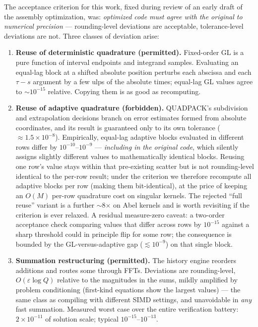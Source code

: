 \documentclass[11pt]{article}
\begin{document}
The acceptance criterion for this work, fixed during review of an
early draft of the assembly optimization, was: \emph{optimized code
must agree with the original to numerical precision} --- rounding-level
deviations are acceptable, tolerance-level deviations are not. Three
classes of deviation arise:

\begin{enumerate}
\item \textbf{Reuse of deterministic quadrature (permitted).}
  Fixed-order GL is a pure function of interval endpoints and integrand
  samples. Evaluating an equal-lag block at a shifted absolute position
  perturbs each abscissa and each $\tau-s$ argument by a few ulps of
  the absolute times; equal-lag GL values agree to $\sim10^{-15}$
  relative. Copying them is as good as recomputing.
\item \textbf{Reuse of adaptive quadrature (forbidden).} QUADPACK's
  subdivision and extrapolation decisions branch on error estimates
  formed from absolute coordinates, and its result is guaranteed only
  to its own tolerance ($\approx1.5\times10^{-8}$). Empirically,
  equal-lag adaptive blocks evaluated in different rows differ by
  $10^{-10}$--$10^{-9}$ --- \emph{including in the original code},
  which silently assigns slightly different values to mathematically
  identical blocks. Reusing one row's value stays within that
  pre-existing scatter but is not rounding-level identical to the
  per-row result; under the criterion we therefore recompute all
  adaptive blocks per row (making them bit-identical), at the price of
  keeping an $O(M)$ per-row quadrature cost on singular kernels. The
  rejected ``full reuse'' variant is a further $\sim$8$\times$ on Abel
  kernels and is worth revisiting if the criterion is ever relaxed. A
  residual measure-zero caveat: a two-order acceptance check comparing
  values that differ across rows by $10^{-15}$ against a sharp
  threshold could in principle flip for some row; the consequence is
  bounded by the GL-versus-adaptive gap ($\lesssim10^{-9}$) on that
  single block.
\item \textbf{Summation restructuring (permitted).} The history engine
  reorders additions and routes some through FFTs. Deviations are
  rounding-level, $O(\varepsilon\log Q)$ relative to the magnitudes in
  the sums, mildly amplified by problem conditioning (first-kind
  equations show the largest values) --- the same class as compiling
  with different SIMD settings, and unavoidable in \emph{any} fast
  summation. Measured worst case over the entire verification battery:
  $2\times10^{-11}$ of solution scale; typical
  $10^{-15}$--$10^{-13}$.
\end{enumerate}
\end{document}
